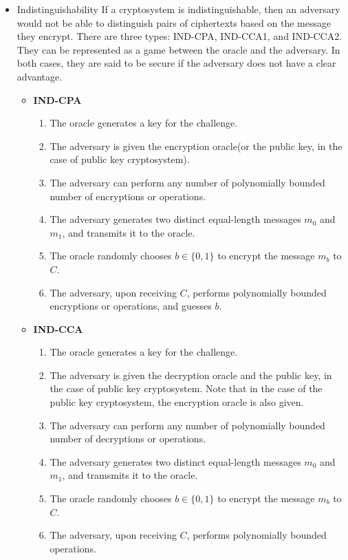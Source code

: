 \documentclass{report}
\begin{document}
\begin{itemize}
			\item Indistinguishability
			\subitem If a cryptosystem is indistinguishable, then an adversary would not be able to distinguish pairs of ciphertexts based on the message they encrypt. There are three types: IND-CPA, IND-CCA1, and IND-CCA2. They can be represented as a game between the oracle and the adversary. In both cases, they are said to be secure if the adversary does not have a clear advantage.
			\begin{itemize}
				\item \textbf{IND-CPA}
				\begin{enumerate}
					\item The oracle generates a key for the challenge.
					\item The adversary is given the encryption oracle(or the public key, in the case of public key cryptosystem).
					\item The adversary can perform any number of polynomially bounded number of encryptions or operations.
					\item The adversary generates two distinct equal-length messages $m_0$ and $m_1$, and transmits it to the oracle.
					\item The oracle randomly chooses $b \in \{0,1\}$ to encrypt the message $m_b$ to $C$.
					\item The adversary, upon receiving $C$, performs polynomially bounded encryptions or operations, and guesses $b$.
				\end{enumerate}
				\item \textbf{IND-CCA}
				\begin{enumerate}
					\item The oracle generates a key for the challenge.
					\item The adversary is given the decryption oracle and the public key, in the case of public key cryptosystem.
						\subitem Note that in the case of the public key cryptosystem, the encryption oracle is also given.
					\item The adversary can perform any number of polynomially bounded number of decryptions or operations.
					\item The adversary generates two distinct equal-length messages $m_0$ and $m_1$, and tramsmits it to the oracle.
					\item The oracle randomly chooses $b \in \{0,1\}$ to encrypt the message $m_b$ to $C$.
					\item The adversary, upon receiving $C$, performs polynomially bounded operations.

\end{enumerate}
\end{itemize}
\end{itemize}
\end{document}
